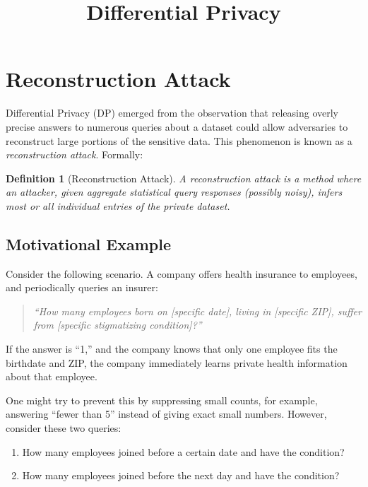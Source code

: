 \documentclass[11pt, a4paper]{article}
\newtheorem{definition}{Definition}
\begin{document}
\title{Differential Privacy}
\author{}
\date{}
\maketitle

\section{Reconstruction Attack}

Differential Privacy (DP) emerged from the observation that releasing overly precise answers to numerous queries about a dataset could allow adversaries to reconstruct large portions of the sensitive data. This phenomenon is known as a \emph{reconstruction attack}. Formally:

\begin{definition}[Reconstruction Attack]
A reconstruction attack is a method where an attacker, given aggregate statistical query responses (possibly noisy), infers most or all individual entries of the private dataset.
\end{definition}

\subsection{Motivational Example}

Consider the following scenario. A company offers health insurance to employees, and periodically queries an insurer:
\begin{quote}
    \textit{``How many employees born on [specific date], living in [specific ZIP], suffer from [specific stigmatizing condition]?''}
\end{quote}

If the answer is ``1,'' and the company knows that only one employee fits the birthdate and ZIP, the company immediately learns private health information about that employee.

One might try to prevent this by suppressing small counts, for example, answering ``fewer than 5'' instead of giving exact small numbers. However, consider these two queries:
\begin{enumerate}
    \item How many employees joined before a certain date and have the condition?
    \item How many employees joined before the next day and have the condition?
\end{enumerate}
\end{document}
